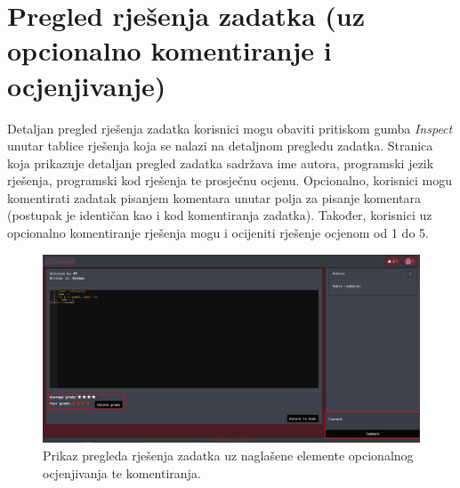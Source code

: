 \documentclass[times, utf8, zavrsni]{fer}
\begin{document}
		\section{Pregled rješenja zadatka (uz opcionalno komentiranje i ocjenjivanje)}
		Detaljan pregled rješenja zadatka korisnici mogu obaviti pritiskom gumba \textit{Inspect} unutar tablice rješenja koja se nalazi na detaljnom pregledu zadatka. Stranica koja prikazuje detaljan pregled zadatka sadržava ime autora, programski jezik rješenja, programski kod rješenja te prosječnu ocjenu. Opcionalno, korisnici mogu komentirati zadatak pisanjem komentara unutar polja za pisanje komentara (postupak je identičan kao i kod komentiranja zadatka). Također, korisnici uz opcionalno komentiranje rješenja mogu i ocijeniti rješenje ocjenom od 1 do 5.
		\begin{figure}[htb]
			\centering
			\includegraphics[width=\linewidth]{pictures/koristenje/PregledRjesenja.png}
			\caption{Prikaz pregleda rješenja zadatka uz naglašene elemente opcionalnog ocjenjivanja te komentiranja.}
			\label{fig:pregledrjesenje}
		\end{figure}
	
\end{document}
